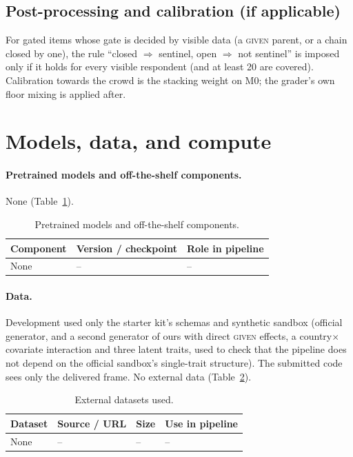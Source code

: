 \documentclass{article}
\begin{document}
\subsection{Post-processing and calibration (if applicable)}
For gated items whose gate is decided by visible data (a \textsc{given} parent, or a chain closed by one), the rule ``closed $\Rightarrow$ sentinel, open $\Rightarrow$ not sentinel'' is imposed only if it holds for every visible respondent (and at least 20 are covered). Calibration towards the crowd is the stacking weight on M0; the grader's own floor mixing is applied after.

\section{Models, data, and compute}
\label{sec:resources}

\paragraph{Pretrained models and off-the-shelf components.} None (Table~\ref{tab:models}).
\begin{table}[h]
  \centering
  \caption{Pretrained models and off-the-shelf components.}
  \label{tab:models}
  \begin{tabular}{lll}
    \toprule
    Component & Version / checkpoint & Role in pipeline  \\
    \midrule
    None & -- & -- \\
    \bottomrule
  \end{tabular}
\end{table}

\paragraph{Data.} Development used only the starter kit's schemas and synthetic sandbox (official generator, and a second generator of ours with direct \textsc{given} effects, a country$\times$covariate interaction and three latent traits, used to check that the pipeline does not depend on the official sandbox's single-trait structure). The submitted code sees only the delivered frame. No external data (Table~\ref{tab:external}).
\begin{table}[h]
  \centering
  \caption{External datasets used.}
  \label{tab:external}
  \begin{tabular}{llll}
    \toprule
    Dataset & Source / URL & Size & Use in pipeline \\
    \midrule
    None & -- & -- & -- \\
    \bottomrule
  \end{tabular}
\end{table}
\end{document}
